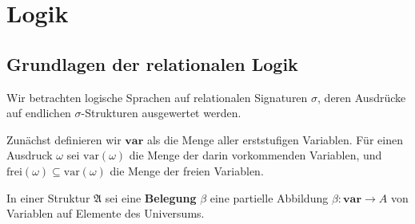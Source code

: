 
\chapter{Logik}

\section{Grundlagen der relationalen Logik}

Wir betrachten logische Sprachen auf relationalen Signaturen $\sigma$,
deren Ausdrücke auf endlichen $\sigma$-Strukturen ausgewertet werden.

Zunächst definieren wir $\mathbf{var}$ als die Menge aller erststufigen
Variablen. Für einen Ausdruck $\omega$ sei $\mathrm{var}\left(\omega\right)$
die Menge der darin vorkommenden Variablen, und $\mathrm{frei}\left(\omega\right)\subseteq\mathrm{var}\left(\omega\right)$
die Menge der freien Variablen.

In einer Struktur $\mathfrak{A}$ sei eine \textbf{Belegung} $\beta$
eine partielle Abbildung $\beta:\mathbf{var}\rightarrow A$ von Variablen
auf Elemente des Universums.

